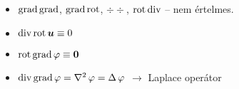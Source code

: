 \documentclass[main.tex]{subfiles}
\begin{document}
\begin{itemize}
  \item $\operatorname{grad} \operatorname{grad}$,
        $\operatorname{grad} \operatorname{rot}$,
        $\div \div$,
        $\operatorname{rot} \operatorname{div}$
        – nem értelmes.

  \item $\operatorname{div} \operatorname{rot} \boldsymbol{u} \equiv 0$

  \item $\operatorname{rot} \operatorname{grad} \varphi \equiv \boldsymbol{0}$

  \item $\div \grad \varphi
          = \laplacian \, \varphi
          = \Delta \, \varphi$
        \hspace{1em} $\rightarrow$ \hspace{1em}
        Laplace operátor
\end{itemize}

\pagebreak
\end{document}
